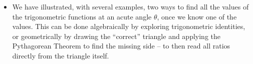 \documentclass{ximera}
\begin{document}
\begin{summary}\begin{itemize}
\item We have illustrated, with several examples, two ways to find all the values of the trigonometric functions at an acute angle $\theta$, once we know one of the values. This can be done algebraically by exploring trigonometric identities, or geometrically by drawing the ``correct'' triangle and applying the Pythagorean Theorem to find the missing side -- to then read all ratios directly from the triangle itself.
\end{itemize}\end{summary}
\end{document}
